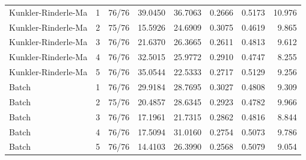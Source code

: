 \begin{table}[H]
{\begin{tabular}{llrrrrrr}
        \midrule

        Kunkler-Rinderle-Ma
        & 1 & 76/76 & 39.0450 & 36.7063 & 0.2666 & 0.5173 & 10.976 \\
        Kunkler-Rinderle-Ma
        & 2 & 75/76 & 15.5926 & 24.6909 & 0.3075 & 0.4619 & 9.865 \\
        Kunkler-Rinderle-Ma
        & 3 & 76/76 & 21.6370 & 26.3665 & 0.2611 & 0.4813 & 9.612 \\
        Kunkler-Rinderle-Ma
        & 4 & 76/76 & 32.5015 & 25.9772 & 0.2910 & 0.4747 & 8.255 \\
        Kunkler-Rinderle-Ma
        & 5 & 76/76 & 35.0544 & 22.5333 & 0.2717 & 0.5129 & 9.256 \\

        \midrule

        Batch
        & 1 & 76/76 & 29.9184 & 28.7695 & 0.3027 & 0.4808 & 9.309 \\
        Batch
        & 2 & 75/76 & 20.4857 & 28.6345 & 0.2923 & 0.4782 & 9.966 \\
        Batch
        & 3 & 76/76 & 17.1961 & 21.7315 & 0.2862 & 0.4816 & 8.844 \\
        Batch
        & 4 & 76/76 & 17.5094 & 31.0160 & 0.2754 & 0.5073 & 9.786 \\
        Batch
        & 5 & 76/76 & 14.4103 & 26.3990 & 0.2568 & 0.5079 & 9.054 \\

        \bottomrule
    \end{tabular}
    }
\end{table}


